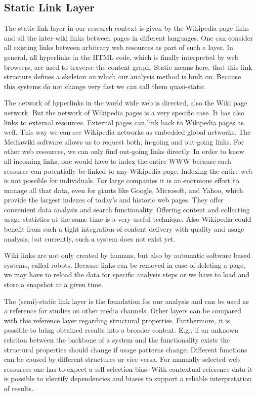 \documentclass[a4paper,10pt]{scrbook}
\begin{document}
\subsection{Static Link Layer} 
The static link layer in our research context is given by the Wikipedia page links and all the inter-wiki links between pages in different languages. One can consider all existing links between arbitrary web resources as part of such a layer. In general, all hyperlinks in the HTML code, which is finally interpreted by web browsers, are used to traverse the content graph. Static means here, that this link structure defines a skeleton on which our analysis method is built on. Because this systems do not change very fast we can call them quasi-static. 

The network of hyperlinks in the world wide web is directed, also the Wiki page network. But the network of Wikipedia pages is a very specific case. It has also links to external resources. External pages can link back to Wikipedia pages as well. This way we can see Wikipedia networks as embedded global networks. The Mediawiki software allows us to request both, in-going and out-going links. For other web resources, we can only find out-going links directly. In order to know all incoming links, one would have to index the entire WWW because each resource can potentially be linked to any Wikipedia page. Indexing the entire web is not possible for individuals. For large companies it is an enormous effort to manage all that data, even for giants like Google, Microsoft, and Yahoo, which provide the largest indexes of today's and historic web pages. They offer convenient data analysis and search functionality. Offering content and collecting usage statistics at the same time is a very useful technique. Also Wikipedia could benefit from such a tight integration of content delivery with quality and usage analysis, but currently, such a system does not exist yet.   

Wiki links are not only created by humans, but also by automatic software based systems, called robots. Because links can be removed in case of deleting a page, we may have to reload the data for specific analysis steps or we have to load and store a snapshot at a given time.

The (semi)-static link layer is the foundation for our analysis and can be used as a reference for studies on other media channels. Other layers can be compared with this reference layer regarding structural properties. Furthermore, it is possible to bring obtained results into a broader context. E.g., if an unknown relation between the  backbone of a system and the functionality exists the structural properties should change if usage patterns change. Different functions can be caused by different structures or vice versa. For manually selected web resources one has to expect a self selection bias. With contextual reference data it is possible to identify dependencies and biases to support a reliable interpretation of results.
\end{document}
